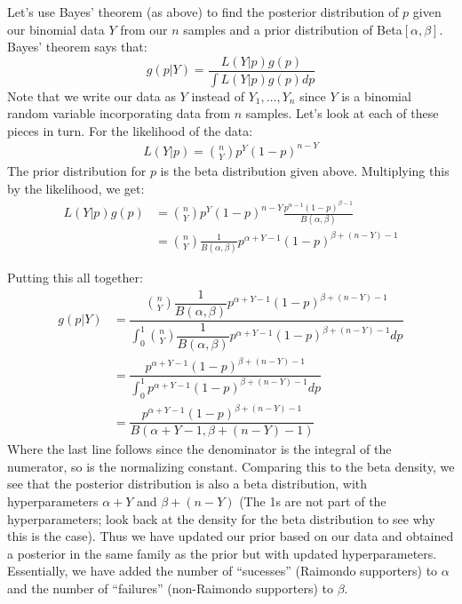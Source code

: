\documentclass[notes.tex]{subfiles}
\begin{document}
\begin{enumerate}
Let's use Bayes' theorem (as above) to find the posterior distribution of $p$ given our binomial data $Y$ from our $n$ samples and a prior distribution of Beta$[\alpha, \beta]$.
Bayes' theorem says that:
\[
g(p | Y) = \frac{ L(Y | p ) g(p) }{ \int L(Y|p) g(p) dp }
\] 
Note that we write our data as $Y$ instead of $Y_1, \dots, Y_n$ since $Y$ is a binomial random variable incorporating data from $n$ samples. Let's look at each of these pieces in turn. For the likelihood of the data:
\begin{align*}
L(Y | p ) = \binom{n}{Y}p^{Y}(1-p)^{n-Y}
\end{align*}
The prior distribution for $p$ is the beta distribution given above. Multiplying this by the likelihood, we get:
\begin{align*}
L(Y|p) g(p) &= \binom{n}{Y}p^{Y}(1-p)^{n-Y} \frac{ p^{\alpha - 1} (1-p)^{\beta - 1} }{ B(\alpha, \beta) }\\
&= \binom{n}{Y} \frac{1}{ B(\alpha, \beta) } p^{\alpha + Y - 1} (1-p)^{\beta + (n-Y) - 1}
\end{align*}

Putting this all together:
\begin{align*}
g(p | Y) &= \dfrac{ \binom{n}{Y} \dfrac{1}{ B(\alpha, \beta) } p^{\alpha + Y - 1} (1-p)^{\beta + (n-Y) - 1} }{ \int_0^1 \binom{n}{Y} \dfrac{1}{ B(\alpha, \beta) } p^{\alpha + Y - 1} (1-p)^{\beta + (n-Y) - 1} dp }\\
&= \dfrac{ p^{\alpha + Y - 1} (1-p)^{\beta + (n-Y) - 1} }{ \int_0^1 p^{\alpha + Y - 1} (1-p)^{\beta + (n-Y) - 1} dp }\\
&= \dfrac{ p^{\alpha + Y - 1} (1-p)^{\beta + (n-Y) - 1} }{ B(\alpha + Y - 1, \beta + (n-Y) - 1) }
\end{align*}
Where the last line follows since the denominator is the integral of the numerator, so is the normalizing constant. Comparing this to the beta density, we see that the posterior distribution is also a beta distribution, with hyperparameters $\alpha + Y$ and $\beta + (n - Y)$ (The 1s are not part of the hyperparameters; look back at the density for the beta distribution to see why this is the case). Thus we have updated our prior based on our data and obtained a posterior in the same family as the prior but with updated hyperparameters. Essentially, we have added the number of ``sucesses'' (Raimondo supporters) to $\alpha$ and the number of ``failures'' (non-Raimondo supporters) to $\beta$.\\


\end{enumerate}
\end{document}

